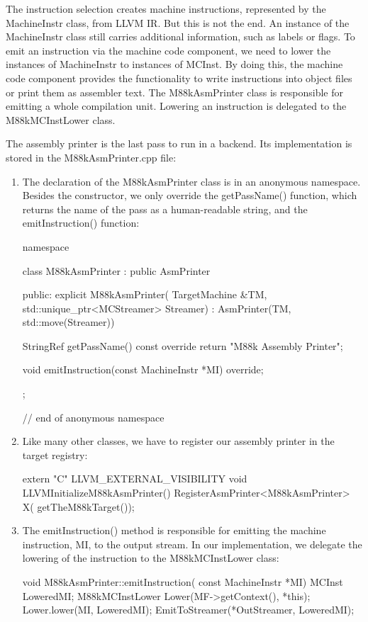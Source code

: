 The instruction selection creates machine instructions, represented by the MachineInstr class, from LLVM IR. But this is not the end. An instance of the MachineInstr class still carries additional information, such as labels or flags. To emit an instruction via the machine code component, we need to lower the instances of MachineInstr to instances of MCInst. By doing this, the machine code component provides the functionality to write instructions into object files or print them as assembler text. The M88kAsmPrinter class is responsible for emitting a whole compilation unit. Lowering an instruction is delegated to the M88kMCInstLower class.

The assembly printer is the last pass to run in a backend. Its implementation is stored in the M88kAsmPrinter.cpp file:

\begin{enumerate}
\item
The declaration of the M88kAsmPrinter class is in an anonymous namespace. Besides the constructor, we only override the getPassName() function, which returns the name of the pass as a human-readable string, and the emitInstruction() function:

\begin{cpp}
namespace {
class M88kAsmPrinter : public AsmPrinter {
public:
    explicit M88kAsmPrinter(
        TargetMachine &TM,
        std::unique_ptr<MCStreamer> Streamer)
        : AsmPrinter(TM, std::move(Streamer)) {}

    StringRef getPassName() const override {
        return "M88k Assembly Printer";
    }

    void emitInstruction(const MachineInstr *MI) override;
};
} // end of anonymous namespace
\end{cpp}

\item
Like many other classes, we have to register our assembly printer in the target registry:

\begin{cpp}
extern "C" LLVM_EXTERNAL_VISIBILITY void
LLVMInitializeM88kAsmPrinter() {
    RegisterAsmPrinter<M88kAsmPrinter> X(
        getTheM88kTarget());
}
\end{cpp}

\item
The emitInstruction() method is responsible for emitting the machine instruction, MI, to the output stream. In our implementation, we delegate the lowering of the instruction to the M88kMCInstLower class:

\begin{cpp}
void M88kAsmPrinter::emitInstruction(
        const MachineInstr *MI) {
    MCInst LoweredMI;
    M88kMCInstLower Lower(MF->getContext(), *this);
    Lower.lower(MI, LoweredMI);
    EmitToStreamer(*OutStreamer, LoweredMI);
}
\end{cpp}
\end{enumerate}

